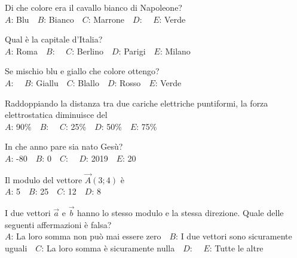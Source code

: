 \mcquestionheader Di che colore era il cavallo bianco di Napoleone?\\
{$A$}: Blu\ \ {$B$}: Bianco\ \ {$C$}: Marrone\ \ {$D$}: \ \ {$E$}: Verde\ \ 

\mcquestionfooter



\def\mcquestionnumber{8}


\mcquestionheader Qual è la capitale d’Italia?\\
{$A$}: Roma\ \ {$B$}: \ \ {$C$}: Berlino\ \ {$D$}: Parigi\ \ {$E$}: Milano\ \ 

\mcquestionfooter



\def\mcquestionnumber{9}


\mcquestionheader Se mischio blu e giallo che colore ottengo?\\
{$A$}: \ \ {$B$}: Giallu\ \ {$C$}: Blallo\ \ {$D$}: Rosso\ \ {$E$}: Verde\ \ 

\mcquestionfooter



\def\mcquestionnumber{10}


\mcquestionheader Raddoppiando la distanza tra due cariche elettriche puntiformi, la forza elettrostatica diminuisce del\\
{$A$}: 90\%\ \ {$B$}: \ \ {$C$}: 25\%\ \ {$D$}: 50\%\ \ {$E$}: 75\%\ \ 

\mcquestionfooter



\def\mcquestionnumber{11}


\mcquestionheader In che anno pare sia nato Gesù?\\
{$A$}: -80\ \ {$B$}: 0\ \ {$C$}: \ \ {$D$}: 2019\ \ {$E$}: 20\ \ 

\mcquestionfooter



\def\mcquestionnumber{12}


\mcquestionheader Il modulo del vettore $\vec{A}(3;4)$ è\\
{$A$}: 5\ \ {$B$}: 25\ \ {$C$}: 12\ \ {$D$}: 8\ \ 

\mcquestionfooter



\mcpaperfooter

\def\mcserialnumber{14}
\mcpaperheader


\def\mcquestionnumber{1}


\mcquestionheader I due vettori $\vec{a}$ e $\vec{b}$ hanno lo stesso modulo e la stessa direzione. Quale delle seguenti affermazioni è falsa?\\
{$A$}: La loro somma non può mai essere zero\ \ {$B$}: I due vettori sono sicuramente uguali\ \ {$C$}: La loro somma è sicuramente nulla\ \ {$D$}: \ \ {$E$}: Tutte le altre\ \ 


